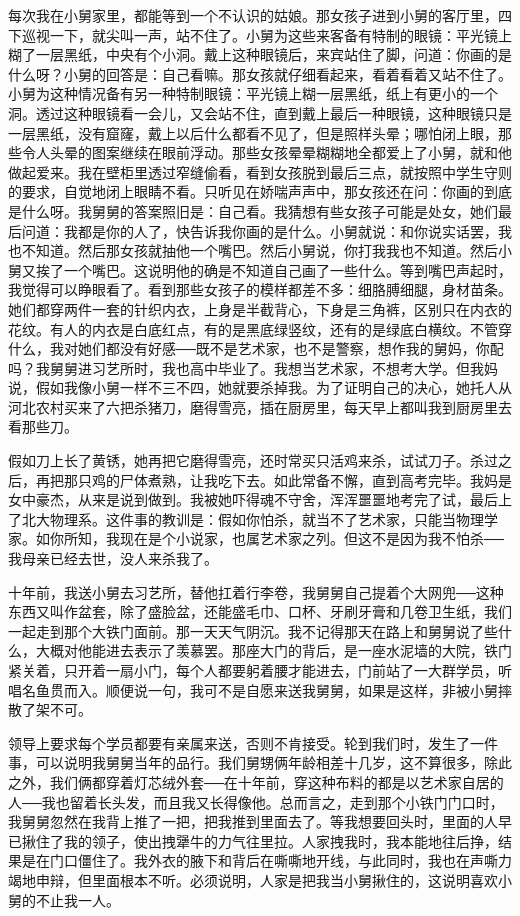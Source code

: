 每次我在小舅家里，都能等到一个不认识的姑娘。那女孩子进到小舅的客厅里，四下巡视一下，就尖叫一声，站不住了。小舅为这些来客备有特制的眼镜：平光镜上糊了一层黑纸，中央有个小洞。戴上这种眼镜后，来宾站住了脚，问道：你画的是什么呀？小舅的回答是：自己看嘛。那女孩就仔细看起来，看着看着又站不住了。小舅为这种情况备有另一种特制眼镜：平光镜上糊一层黑纸，纸上有更小的一个洞。透过这种眼镜看一会儿，又会站不住，直到戴上最后一种眼镜，这种眼镜只是一层黑纸，没有窟窿，戴上以后什么都看不见了，但是照样头晕；哪怕闭上眼，那些令人头晕的图案继续在眼前浮动。那些女孩晕晕糊糊地全都爱上了小舅，就和他做起爱来。我在壁柜里透过窄缝偷看，看到女孩脱到最后三点，就按照中学生守则的要求，自觉地闭上眼睛不看。只听见在娇喘声声中，那女孩还在问：你画的到底是什么呀。我舅舅的答案照旧是：自己看。我猜想有些女孩子可能是处女，她们最后问道：我都是你的人了，快告诉我你画的是什么。小舅就说：和你说实话罢，我也不知道。然后那女孩就抽他一个嘴巴。然后小舅说，你打我我也不知道。然后小舅又挨了一个嘴巴。这说明他的确是不知道自己画了一些什么。等到嘴巴声起时，我觉得可以睁眼看了。看到那些女孩子的模样都差不多：细胳膊细腿，身材苗条。她们都穿两件一套的针织内衣，上身是半截背心，下身是三角裤，区别只在内衣的花纹。有人的内衣是白底红点，有的是黑底绿竖纹，还有的是绿底白横纹。不管穿什么，我对她们都没有好感──既不是艺术家，也不是警察，想作我的舅妈，你配吗？我舅舅进习艺所时，我也高中毕业了。我想当艺术家，不想考大学。但我妈说，假如我像小舅一样不三不四，她就要杀掉我。为了证明自己的决心，她托人从河北农村买来了六把杀猪刀，磨得雪亮，插在厨房里，每天早上都叫我到厨房里去看那些刀。 

假如刀上长了黄锈，她再把它磨得雪亮，还时常买只活鸡来杀，试试刀子。杀过之后，再把那只鸡的尸体煮熟，让我吃下去。如此常备不懈，直到高考完毕。我妈是女中豪杰，从来是说到做到。我被她吓得魂不守舍，浑浑噩噩地考完了试，最后上了北大物理系。这件事的教训是：假如你怕杀，就当不了艺术家，只能当物理学家。如你所知，我现在是个小说家，也属艺术家之列。但这不是因为我不怕杀──我母亲已经去世，没人来杀我了。 

十年前，我送小舅去习艺所，替他扛着行李卷，我舅舅自己提着个大网兜──这种东西又叫作盆套，除了盛脸盆，还能盛毛巾、口杯、牙刷牙膏和几卷卫生纸，我们一起走到那个大铁门面前。那一天天气阴沉。我不记得那天在路上和舅舅说了些什么，大概对他能进去表示了羡慕罢。那座大门的背后，是一座水泥墙的大院，铁门紧关着，只开着一扇小门，每个人都要躬着腰才能进去，门前站了一大群学员，听唱名鱼贯而入。顺便说一句，我可不是自愿来送我舅舅，如果是这样，非被小舅摔散了架不可。 

领导上要求每个学员都要有亲属来送，否则不肯接受。轮到我们时，发生了一件事，可以说明我舅舅当年的品行。我们舅甥俩年龄相差十几岁，这不算很多，除此之外，我们俩都穿着灯芯绒外套──在十年前，穿这种布料的都是以艺术家自居的人──我也留着长头发，而且我又长得像他。总而言之，走到那个小铁门门口时，我舅舅忽然在我背上推了一把，把我推到里面去了。等我想要回头时，里面的人早已揪住了我的领子，使出拽犟牛的力气往里拉。人家拽我时，我本能地往后挣，结果是在门口僵住了。我外衣的腋下和背后在嘶嘶地开线，与此同时，我也在声嘶力竭地申辩，但里面根本不听。必须说明，人家是把我当小舅揪住的，这说明喜欢小舅的不止我一人。 

